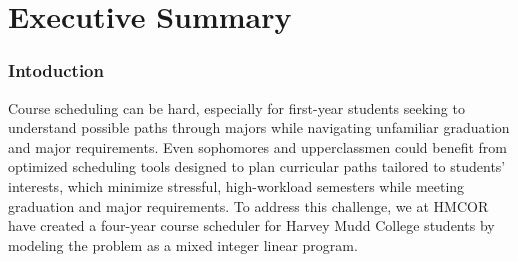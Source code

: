 \documentclass[12pt]{article}
\begin{document}
\newpage 
\fi

\begin{abstract}
    Four-year course planning to maximize student interest while balancing graduation requirements, prerequisites, and semesterly workloads is a challenging optimization problem faced by many students at Harvey Mudd College.
    This problem is especially relevant for first-year students seeking to understand how well different majors align with their curricular interests, yet it is also especially challenging, as these students are the least familiar with the graduation requirements and course prerequisites.
    To address this, we develop a model for four-year course planning, seeking to optimize a student's total cumulative interest in their planned coursework, subject to constraints corresponding to graduation requirements, course requisites, and semesterly workload limitations.
    After gathering a student's preferences, we express the optimization problem as a mixed integer program and solve it with a standard solver.
    We then analyze the sensitivity of our model to the choice of penalty parameters controlling the tradeoffs between the total course desirability, robustness to conflicts, and stressfulness of the plans produced by our model.
\end{abstract}

\part{Executive Summary}

\section{Intoduction}

Course scheduling can be hard, especially for first-year students seeking to understand possible paths through majors while navigating unfamiliar graduation and major requirements.
Even sophomores and upperclassmen could benefit from optimized scheduling tools designed to plan curricular paths tailored to students' interests, which minimize stressful, high-workload semesters while meeting graduation and major requirements.
To address this challenge, we at HMCOR have created a four-year course scheduler for Harvey Mudd College students by modeling the problem as a mixed integer linear program.
\end{document}

